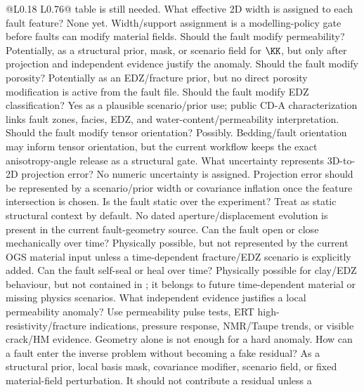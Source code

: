 \begin{longtable}{@{}L{0.18\textwidth} L{0.76\textwidth}@{}}
{table is still needed.}
{ What effective 2D width is assigned to each fault feature?}
{None yet.  Width/support assignment is a modelling-policy gate before faults can
modify material fields.}
{ Should the fault modify permeability?}
{Potentially, as a structural prior, mask, or scenario field for \(\KK\), but only
after projection and independent evidence justify the anomaly.}
{ Should the fault modify porosity?}
{Potentially as an EDZ/fracture prior, but no direct porosity modification is active
from the fault file.}
{ Should the fault modify EDZ classification?}
{Yes as a plausible scenario/prior use; public CD-A characterization links fault
zones, facies, EDZ, and water-content/permeability interpretation.}
{ Should the fault modify tensor orientation?}
{Possibly.  Bedding/fault orientation may inform tensor orientation, but the current
workflow keeps the exact anisotropy-angle release as a structural gate.}
{ What uncertainty represents 3D-to-2D projection error?}
{No numeric uncertainty is assigned.  Projection error should be represented by a
scenario/prior width or covariance inflation once the feature intersection is chosen.}
{ Is the fault static over the experiment?}
{Treat as static structural context by default.  No dated aperture/displacement
evolution is present in the current fault-geometry source.}
{ Can the fault open or close mechanically over time?}
{Physically possible, but not represented by the current OGS material input unless a
time-dependent fracture/EDZ scenario is explicitly added.}
{ Can the fault self-seal or heal over time?}
{Physically possible for clay/EDZ behaviour, but not contained in
; it belongs to future time-dependent material or missing
physics scenarios.}
{ What independent evidence justifies a local permeability anomaly?}
{Use permeability pulse tests, ERT high-resistivity/fracture indications, pressure
response, NMR/Taupe trends, or visible crack/HM evidence.  Geometry alone is not
enough for a hard anomaly.}
{ How can a fault enter the inverse problem without becoming a fake residual?}
{As a structural prior, local basis mask, covariance modifier, scenario field, or
fixed material-field perturbation.  It should not contribute a residual unless a
}
\end{longtable}
